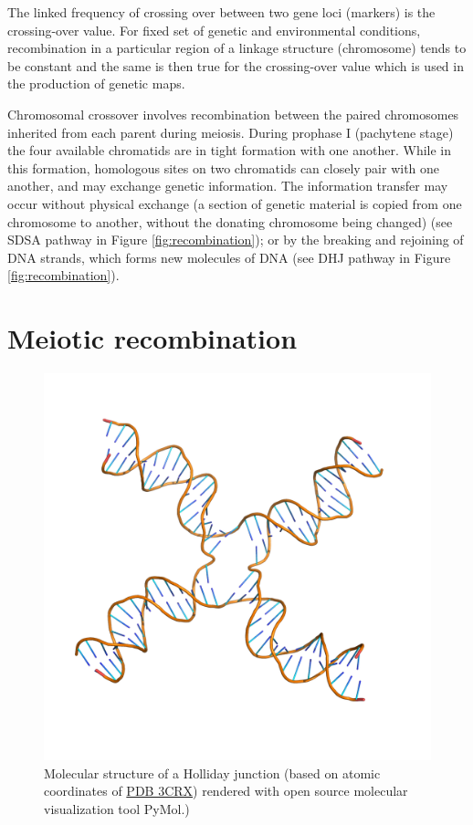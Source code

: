 The linked frequency of crossing over between two gene loci (markers) is the crossing-over value. For fixed set of genetic and environmental conditions, recombination in a particular region of a linkage structure (chromosome) tends to be constant and the same is then true for the crossing-over value which is used in the production of genetic maps.

Chromosomal crossover involves recombination between the paired chromosomes inherited from each parent during meiosis. During prophase I (pachytene stage) the four available chromatids are in tight formation with one another. While in this formation, homologous sites on two chromatids can closely pair with one another, and may exchange genetic information. The information transfer may occur without physical exchange (a section of genetic material is copied from one chromosome to another, without the donating chromosome being changed) (see SDSA pathway in Figure \ref{fig:recombination}); or by the breaking and rejoining of DNA strands, which forms new molecules of DNA (see DHJ pathway in Figure \ref{fig:recombination}).

\hypertarget{meiotic-recombination}{%
\section{Meiotic recombination}\label{meiotic-recombination}}



\begin{figure}

{\centering \includegraphics[width=0.7\linewidth]{./figures/linkage/HolidayJunction} 

}

\caption{Molecular structure of a Holliday junction (based on atomic coordinates of \href{https://www.rcsb.org/structure/3crx}{PDB 3CRX}) rendered with open source molecular visualization tool PyMol.)}\label{fig:holliday}
\end{figure}

